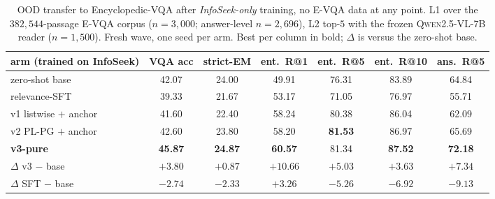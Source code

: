 \begin{table}[t]
\centering\small
\caption{OOD transfer to Encyclopedic-VQA after \emph{InfoSeek-only} training, no E-VQA data at
any point. L1 over the $382{,}544$-passage E-VQA corpus ($n{=}3{,}000$; answer-level $n{=}2{,}696$),
L2 top-$5$ with the frozen \textsc{Qwen2.5-VL-7B} reader ($n{=}1{,}500$). Fresh wave, one seed per
arm. Best per column in bold; $\Delta$ is versus the zero-shot base.}
\label{tab:mm_evqa}
\begin{tabular}{lcccccc}
\toprule
arm (trained on InfoSeek) & VQA acc & strict-EM & ent.\ R@1 & ent.\ R@5 & ent.\ R@10 & ans.\ R@5 \\
\midrule
zero-shot base      & 42.07 & 24.00 & 49.91 & 76.31 & 83.89 & 64.84 \\
relevance-SFT       & 39.33 & 21.67 & 53.17 & 71.05 & 76.97 & 55.71 \\
v1 listwise $+$ anchor & 41.60 & 22.40 & 58.24 & 80.38 & 86.04 & 62.09 \\
v2 PL-PG $+$ anchor & 42.60 & 23.80 & 58.20 & \textbf{81.53} & 86.97 & 65.69 \\
\textbf{v3-pure}    & \textbf{45.87} & \textbf{24.87} & \textbf{60.57} & 81.34 & \textbf{87.52} & \textbf{72.18} \\
\midrule
$\Delta$ v3 $-$ base & $+3.80$ & $+0.87$ & $+10.66$ & $+5.03$ & $+3.63$ & $+7.34$ \\
$\Delta$ SFT $-$ base & $-2.74$ & $-2.33$ & $+3.26$ & $-5.26$ & $-6.92$ & $-9.13$ \\
\bottomrule
\end{tabular}
\end{table}

